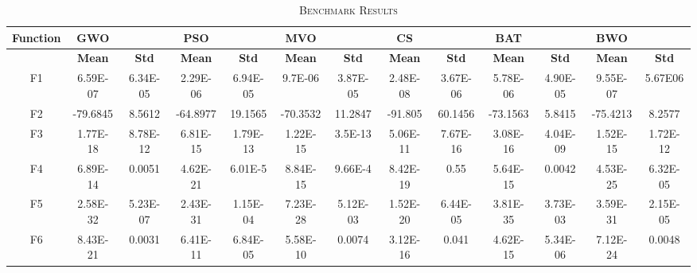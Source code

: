 \documentclass[conference]{IEEEtran}
\theoremstyle{definition}
\begin{document}
\begin{table}[t]
\caption{\textsc{Benchmark Results}}
\label{tab:4}
\centering
\scalebox{0.8}
{
\begin{tabular}{| c | c  c | c  c | c  c | c  c | c  c | c  c |}
\hline
{\textbf{Function}}&{\textbf{GWO}}&{}&{\textbf{PSO}}&{}&{\textbf{MVO}}&{}&{\textbf{CS}}&{}&{\textbf{BAT}}&{}&{\textbf{BWO}}&{}\\
\hline
{}&{\textbf{Mean}}&{\textbf{Std}}&{\textbf{Mean}}&{\textbf{Std}}&{\textbf{Mean}}&{\textbf{Std}}&{\textbf{Mean}}&{\textbf{Std}}&{\textbf{Mean}}&{\textbf{Std}}&{\textbf{Mean}}&{\textbf{Std}}\\
\hline
{F1}&{6.59E-07}&{6.34E-05}&{2.29E-06}&{6.94E-05}&{9.7E-06}&{3.87E-05}&{2.48E-08}&{3.67E-06}&{5.78E-06}&{4.90E-05}&{9.55E-07}&{5.67E06}\\
{F2}&{-79.6845}&{8.5612}&{-64.8977}&{19.1565}&{-70.3532}&{11.2847}&{-91.805}&{60.1456}&{-73.1563}&{5.8415}&{-75.4213}&{8.2577}\\
{F3}&{1.77E-18}&{8.78E-12}&{6.81E-15}&{1.79E-13}&{1.22E-15}&{3.5E-13}&{5.06E-11}&{7.67E-16}&{3.08E-16}&{4.04E-09}&{1.52E-15}&{1.72E-12}\\
{F4}&{6.89E-14}&{0.0051}&{4.62E-21}&{6.01E-5}&{8.84E-15}&{9.66E-4}&{8.42E-19}&{0.55}&{5.64E-15}&{0.0042}&{4.53E-25}&{6.32E-05}\\
{F5}&{2.58E-32}&{5.23E-07}&{2.43E-31}&{1.15E-04}&{7.23E-28}&{5.12E-03}&{1.52E-20}&{6.44E-05}&{3.81E-35}&{3.73E-03}&{3.59E-31}&{2.15E-05}\\
{F6}&{8.43E-21}&{0.0031}&{6.41E-11}&{6.84E-05}&{5.58E-10}&{0.0074}&{3.12E-16}&{0.041}&{4.62E-15}&{5.34E-06}&{7.12E-24}&{0.0048}\\
\hline
\end{tabular}
}
\end{table}
\end{document}
